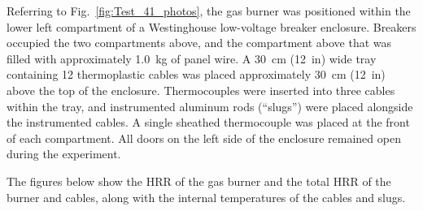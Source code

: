 Referring to Fig.~\ref{fig:Test_41_photos}, the gas burner was positioned within the lower left compartment of a Westinghouse low-voltage breaker enclosure. Breakers occupied the two compartments above, and the compartment above that was filled with approximately 1.0~kg of panel wire. A 30~cm (12~in) wide tray containing 12 thermoplastic cables was placed approximately 30~cm (12~in) above the top of the enclosure. Thermocouples were inserted into three cables within the tray, and instrumented aluminum rods (``slugs'') were placed alongside the instrumented cables. A single sheathed thermocouple was placed at the front of each compartment. All doors on the left side of the enclosure remained open during the experiment.

The figures below show the HRR of the gas burner and the total HRR of the burner and cables, along with the internal temperatures of the cables and slugs.

